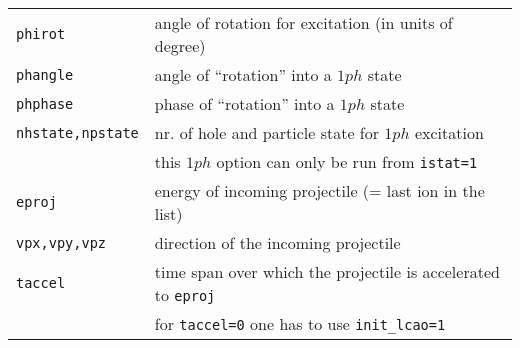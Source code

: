 \documentclass[12pt]{article}
\begin{document}
\begin{enumerate}
\begin{tabular}{ll}
{\tt phirot} & angle of rotation for excitation (in units of degree)\\
{\tt phangle}        & angle of ``rotation'' into a $1ph$ state\\
{\tt phphase}        & phase of ``rotation'' into a $1ph$ state\\
{\tt nhstate,npstate}& nr. of hole and particle state for $1ph$
                      excitation\\
                     & this $1ph$ option can only be run from {\tt istat=1}
\\
{\tt eproj}& energy of incoming projectile (= last ion in the list)
\\
{\tt vpx,vpy,vpz}& direction of the incoming projectile
\\
{\tt taccel}& time span over which the projectile is accelerated to
             {\tt eproj}
\\
& for {\tt taccel=0} one has to use {\tt init\_lcao=1}
\\
\hline
\end{tabular}


\end{enumerate}
\end{document}
